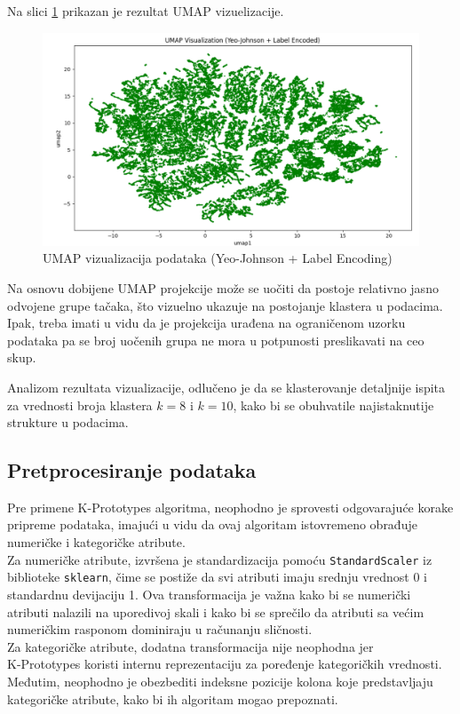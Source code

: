 \documentclass[a4paper,12pt]{article}
\begin{document}
Na slici \ref{Slika:umap} prikazan je rezultat UMAP vizuelizacije.
\newpage
\begin{figure}[htbp]
    	\centering
    	\includegraphics[width=1\textwidth]{./images/umap.png}
    	\caption{UMAP vizualizacija podataka (Yeo-Johnson + Label Encoding)}
    	\label{Slika:umap}
\end{figure}

Na osnovu dobijene UMAP projekcije može se uočiti da postoje relativno jasno odvojene grupe tačaka, što vizuelno ukazuje na postojanje klastera u podacima. Ipak, treba imati u vidu da je projekcija urađena na ograničenom uzorku podataka pa se broj uočenih grupa ne mora u potpunosti preslikavati na ceo skup. 

Analizom rezultata vizualizacije, odlučeno je da se klasterovanje detaljnije ispita za vrednosti broja klastera $k = 8$ i $k = 10$, kako bi se obuhvatile najistaknutije strukture u podacima.
\subsection{Pretprocesiranje podataka}
Pre primene K-Prototypes algoritma, neophodno je sprovesti odgovarajuće korake pripreme podataka, imajući u vidu da ovaj algoritam istovremeno obrađuje numeričke i kategoričke atribute.
\\
Za numeričke atribute, izvršena je standardizacija pomoću \texttt{StandardScaler} iz biblioteke \texttt{sklearn}, čime se postiže da svi atributi imaju srednju vrednost 0 i standardnu devijaciju 1. Ova transformacija je važna kako bi se numerički atributi nalazili na uporedivoj skali i kako bi se sprečilo da atributi sa većim numeričkim rasponom dominiraju u računanju sličnosti.
\\
Za kategoričke atribute, dodatna transformacija nije neophodna jer \\K-Prototypes koristi internu reprezentaciju za poređenje kategoričkih vrednosti. Međutim, neophodno je obezbediti indeksne pozicije kolona koje predstavljaju kategoričke atribute, kako bi ih algoritam mogao prepoznati.
\end{document}
